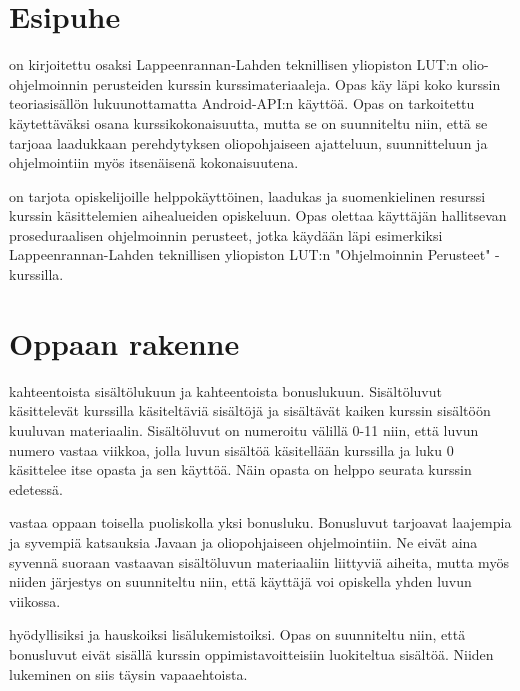 \documentclass{tufte-book}
\newcommand{\lutin}{Lappeenrannan-Lahden teknillisen yliopiston LUT:n }
\begin{document}

\section{Esipuhe}

 on kirjoitettu osaksi \lutin olio-ohjelmoinnin perusteiden kurssin
kurssimateriaaleja. Opas käy läpi koko kurssin  teoriasisällön lukuunottamatta Android-API:n
käyttöä. Opas on tarkoitettu käytettäväksi osana kurssikokonaisuutta, mutta se on suunniteltu
niin, että se tarjoaa laadukkaan perehdytyksen oliopohjaiseen ajatteluun, suunnitteluun ja
ohjelmointiin myös itsenäisenä kokonaisuutena.

 on tarjota opiskelijoille helppokäyttöinen,
laadukas ja suomenkielinen resurssi kurssin käsittelemien aihealueiden
opiskeluun. Opas olettaa käyttäjän hallitsevan proseduraalisen ohjelmoinnin
perusteet, jotka käydään läpi esimerkiksi \lutin "Ohjelmoinnin Perusteet" 
-kurssilla.


\section{Oppaan rakenne}

 kahteentoista sisältölukuun ja kahteentoista bonuslukuun. Sisältöluvut
käsittelevät kurssilla käsiteltäviä sisältöjä ja sisältävät kaiken kurssin sisältöön kuuluvan
materiaalin. Sisältöluvut on numeroitu välillä 0-11 niin, että luvun numero vastaa viikkoa, jolla
luvun sisältöä käsitellään kurssilla ja luku 0 käsittelee itse opasta ja sen käyttöä. Näin opasta
on helppo seurata kurssin edetessä.

 vastaa oppaan toisella puoliskolla yksi bonusluku. Bonusluvut
tarjoavat laajempia ja syvempiä katsauksia Javaan ja oliopohjaiseen ohjelmointiin. Ne eivät aina
syvennä suoraan vastaavan sisältöluvun materiaaliin liittyviä aiheita, mutta myös niiden järjestys
on suunniteltu niin, että käyttäjä voi opiskella yhden luvun viikossa.

 hyödyllisiksi ja hauskoiksi lisälukemistoiksi. Opas on
suunniteltu niin, että bonusluvut eivät sisällä kurssin oppimistavoitteisiin luokiteltua sisältöä.
Niiden lukeminen on siis täysin vapaaehtoista.
\end{document}
